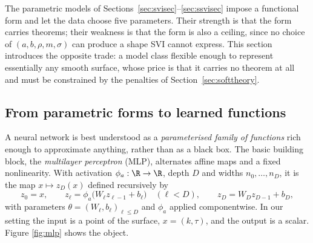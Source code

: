 The parametric models of Sections~\ref{sec:svisec}--\ref{sec:ssvisec} impose a functional form
and let the data choose five parameters. Their strength is that the form carries theorems; their
weakness is that the form is also a ceiling, since no choice of $(a,b,\rho,m,\sigma)$ can produce
a shape SVI cannot express. This section introduces the opposite trade: a model class flexible
enough to represent essentially any smooth surface, whose price is that it carries no theorem at
all and must be constrained by the penalties of Section~\ref{sec:softtheory}.

\subsection{From parametric forms to learned functions}

A neural network is best understood as a \emph{parameterised family of functions} rich enough to
approximate anything, rather than as a black box. The basic building block, the
\emph{multilayer perceptron} (MLP), alternates affine maps and a fixed nonlinearity. With
activation $\phi_a:\R\to\R$, depth $D$ and widths $n_0,\dots,n_D$, it is the map
$x\mapsto z_D(x)$ defined recursively by
\begin{equation}\label{eq:mlp}
z_0=x,\qquad
z_\ell=\phi_a\bigl(W_\ell z_{\ell-1}+b_\ell\bigr)\quad(\ell<D),\qquad
z_D=W_Dz_{D-1}+b_D,
\end{equation}
with parameters $\theta=(W_\ell,b_\ell)_{\ell\le D}$ and $\phi_a$ applied componentwise. In our
setting the input is a point of the surface, $x=(k,\tau)$, and the output is a scalar. Figure
\ref{fig:mlp} shows the object.

